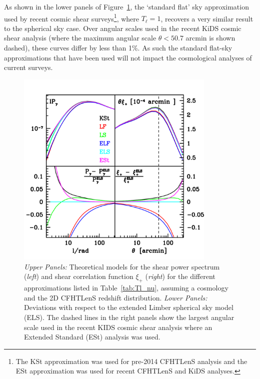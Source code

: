 As shown in the lower panels of Figure~\ref{fig:Cl_xi}, the `standard flat' sky approximation used by recent cosmic shear surveys\footnote{The KSt approximation was used for pre-2014 CFHTLenS analysis and the ESt approximation was used for recent CFHTLenS and KiDS analyses.}, where $T_\ell = 1$, recovers a very similar result to the spherical sky case.  Over angular scales used in the recent KiDS cosmic shear analysis (where the maximum angular scale $\theta<50.7$ arcmin is shown dashed), these curves differ by less than 1\%.  As such the standard flat-sky approximations that have been used will not impact the cosmological analyses of current surveys.
 
 \begin{figure}
 \begin{center}
 \includegraphics[width=0.85\textwidth]{figures/Cl_xi_comp.pdf}
 \caption{ \label{fig:Cl_xi}\emph{Upper Panels:} Theoretical models for the shear power spectrum (\emph{left}) and shear correlation function $\xi_+$ (\emph{right}) for the different approximations listed in Table~\ref{tab:Tl_nu}, assuming a \citet{planck/cosmo:2015} cosmology and the 2D CFHTLenS redshift distribution. \emph{Lower Panels:} Deviations with respect to the extended Limber spherical sky model (ELS).    The dashed lines in the right panels show the largest angular scale used in the recent KIDS cosmic shear analysis where an Extended Standard (ESt) analysis was used.}
 \end{center}
 \end{figure}
 
